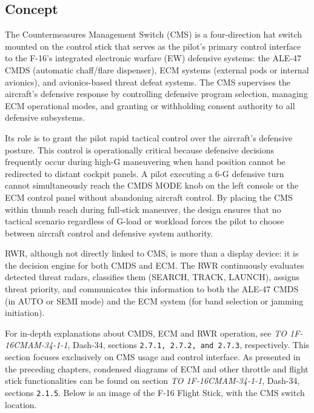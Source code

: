 \documentclass[11pt, a4paper, twoside]{report}
\providecommand{\dashrefs}[1]{\textit{TO 1F-16CMAM-34-1-1}, Dash-34, sections \texttt{#1}}
\begin{document}
\subsection{Concept}
\label{sec:C5-S1-S1}

The Countermeasures Management Switch (CMS) is a four-direction hat switch mounted on the control stick that serves as the pilot's primary control interface to the F-16's integrated electronic warfare (EW) defensive systems: the ALE-47 CMDS (automatic chaff/flare dispenser), ECM systems (external pods or internal avionics), and avionics-based threat defeat systems. The CMS supervises the aircraft's defensive response by controlling defensive program selection, managing ECM operational modes, and granting or withholding consent authority to all defensive subsystems.

Its role is to grant the pilot rapid tactical control over the aircraft's defensive posture. This control is operationally critical because defensive decisions frequently occur during high-G maneuvering when hand position cannot be redirected to distant cockpit panels. A pilot executing a 6-G defensive turn cannot simultaneously reach the CMDS MODE knob on the left console or the ECM control panel without abandoning aircraft control. By placing the CMS within thumb reach during full-stick maneuver, the design ensures that no tactical scenario regardless of G-load or workload forces the pilot to choose between aircraft control and defensive system authority.

RWR, although not directly linked to CMS, is more than a display device: it is the decision engine for both CMDS and ECM. The RWR continuously evaluates detected threat radars, classifies them (SEARCH, TRACK, LAUNCH), assigns threat priority, and communicates this information to both the ALE-47 CMDS (in AUTO or SEMI mode) and the ECM system (for band selection or jamming initiation).

For in-depth explanations about CMDS, ECM and RWR operation, see \dashrefs{2.7.1, 2.7.2, and 2.7.3}, respectively. This section focuses exclusively on CMS usage and control interface. As presented in the preceding chapters, condensed diagrams of ECM and other throttle and flight stick functionalities can be found on section \dashrefs{2.1.5}. Below is an image of the F-16 Flight Stick, with the CMS switch location.
\end{document}
